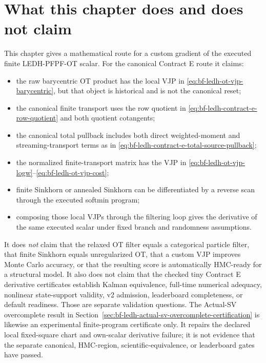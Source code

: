 \section{What this chapter does and does not claim}
\label{sec:bf-ledh-ot-boundary}

This chapter gives a mathematical route for a custom gradient of the executed
finite LEDH-PFPF-OT scalar.  For the canonical Contract E route it claims:
\begin{itemize}
  \item the raw barycentric OT product has the local VJP in
  \eqref{eq:bf-ledh-ot-vjp-barycentric}, but that object is historical and is
  not the canonical reset;
  \item the canonical finite transport uses the row quotient in
  \eqref{eq:bf-ledh-contract-e-row-quotient} and both quotient cotangents;
  \item the canonical total pullback includes both direct weighted-moment and
  streaming-transport terms as in
  \eqref{eq:bf-ledh-contract-e-total-source-pullback};
  \item the normalized finite-transport matrix has the VJP in
  \eqref{eq:bf-ledh-ot-vjp-logw}--\eqref{eq:bf-ledh-ot-vjp-cost};
  \item finite Sinkhorn or annealed Sinkhorn can be differentiated by a reverse
  scan through the executed softmin program;
  \item composing those local VJPs through the filtering loop gives the
  derivative of the same executed scalar under fixed branch and randomness
  assumptions.
\end{itemize}

It does \emph{not} claim that the relaxed OT filter equals a categorical
particle filter, that finite Sinkhorn equals unregularized OT, that a custom VJP
improves Monte Carlo accuracy, or that the resulting score is automatically
HMC-ready for a structural model.  It also does not claim that the checked tiny
Contract E derivative certificates establish Kalman equivalence, full-time
numerical adequacy, nonlinear state-support validity, v2 admission, leaderboard
completeness, or default readiness.  Those are separate validation questions.
The Actual-SV overcomplete result in
Section~\ref{sec:bf-ledh-actual-sv-overcomplete-certification} is likewise an
experimental finite-program certificate only.  It repairs the declared local
fixed-square chart and own-scalar derivative failure; it is not evidence that
the separate canonical, HMC-region, scientific-equivalence, or leaderboard
gates have passed.

\FloatBarrier
